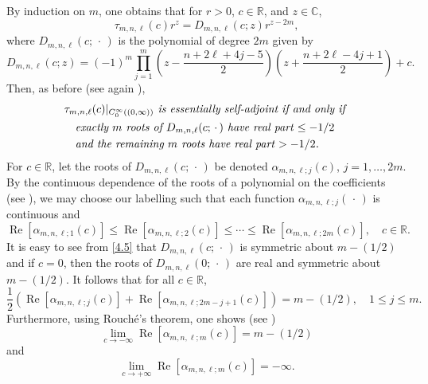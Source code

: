 \documentclass[reqno,11pt,centertags]{amsart}
\newcommand{\bbR}{{\mathbb{R}}}
\newcommand{\bbC}{{\mathbb{C}}}
\newcommand{\<}{\langle}
\renewcommand{\>}{\rangle}
\newcommand{\lb}{\label}
\newcommand{\dott}{\,\cdot\,}
\renewcommand{\Re}{\operatorname{Re}}
\numberwithin{equation}{section}
\theoremstyle{definition}
\begin{document}
By induction on $m$, one obtains  that for $r>0$, $c\in \bbR$, and $z \in \bbC$,   
\begin{equation}\lb{E:Dmnl}
\tau_{m,n,\ell}(c)r^z = D_{m,n,\ell}(c; z)r^{z-2m},
\end{equation}
where $D_{m,n,\ell}(c; \dott)$ is the  polynomial of degree $2m$ given by
\begin{equation}
D_{m,n,\ell}(c; z)= (-1)^m\prod_{j=1}^{m} \left(z-\frac{n + 2 \ell+4j-5}{2}\right)\left(z+ \frac{n+2\ell-4j+1}{2} \right)+c. 
\lb{4.5} 
\end{equation}
Then, as before (see again  \cite[Remark~2.1]{GHT23}),  
\begin{align}
\begin{split} 
& \text{\it  $\tau_{m,n,\ell}(c)|_{C_0^{\infty}((0,\infty))}$ is essentially self-adjoint if and only if } \\
&  \quad \text{\it exactly $m$ roots  of $D_{m,n,\ell}(c; \dott)$ have real part $\leq -1/2$}\\
& \quad \text{\it and the remaining $m$ roots have real part $>-1/2$.}    \lb{4.6}
\end{split}  
\end{align}
For $c\in \bbR$, let the roots of $D_{m,n,\ell}(c;\dott)$ be denoted $\alpha_{m,n,\ell; j}(c)$, $j=1,\ldots,2 m$.
By the continuous dependence of the roots of a polynomial on the coefficients (see 
\cite[Theorem~(1.4)]{Ma66}), we may choose our labelling such that  each function  $\alpha_{m,n,\ell; j}(\dott)$ is continuous  and
\begin{equation} \lb{E:ordering}
\Re [\alpha_{m,n,\ell; 1}(c)] \leq  \Re [\alpha_{m,n,\ell; 2}(c)] \leq \cdots  \leq \Re [\alpha_{m,n,\ell; 2m}(c)],    
\quad c\in \bbR.
\end{equation}
It is easy to see from \eqref{4.5} that $D_{m,n,\ell}(c;\dott)$ is symmetric about $m - (1/2)$ and if $c=0$,   then the roots of $D_{m,n,\ell}(0;\dott)$ are real and symmetric about $m-(1/2)$.
It  follows that for all $c\in \bbR$, 
\begin{equation}\lb{E:symmetry}
\frac{1}{2} \left( \Re [\alpha_{m,n,\ell; j}(c)]  +\Re [\alpha_{m,n,\ell; 2m-j+1}(c)] \right) =m-(1/2),\quad 1\leq j\leq m.
\end{equation}
Furthermore, using Rouch\'e's  theorem, one shows (see \cite[Lemma~4.3]{GHT23}) 
\begin{equation}\lb{E:c to neg infinity}
 \lim_{c\to - \infty} \Re [\alpha_{m,n,\ell;m}(c)] = m-(1/2)
\end{equation}
and
\begin{equation}\lb{E:c to infinity}
 \lim_{c\to + \infty} \Re [\alpha_{m,n,\ell;m}(c)] = -\infty.
\end{equation}
\end{document}
